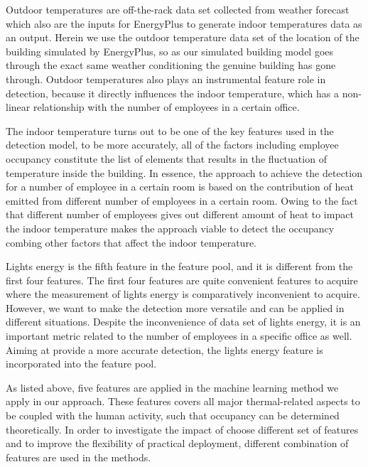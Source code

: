 Outdoor temperatures are off-the-rack data set collected from weather
forecast which also are the inputs for EnergyPlus to generate indoor
temperatures data as an output. Herein we use the outdoor
temperature data set of the location of the building simulated by EnergyPlus, so as
our simulated building model goes through the exact same weather
conditioning the genuine building has gone through. Outdoor
temperatures also plays an instrumental feature role in detection,
because it directly influences the indoor temperature, which has a
non-linear relationship with the number of employees in a certain
office.

The indoor temperature turns out to be one of the key features used in
the detection model, to be more accurately, all of the factors
including employee occupancy constitute the list of elements that
results in the fluctuation of temperature inside the building. In
essence, the approach to achieve the detection for a number of
employee in a certain room is based on the contribution of heat
emitted from different number of employees in a certain room. Owing to
the fact that different number of employees gives out different amount
of heat to impact the indoor temperature makes the approach viable to
detect the occupancy combing other factors that affect the indoor
temperature.

Lights energy is the fifth feature in the feature pool, and it is
different from the first four features. The first four features are quite
convenient features to acquire where the measurement of lights energy
is comparatively inconvenient to acquire. However, we want to make the
detection more versatile and can be applied in different situations.
Despite the inconvenience of data set of lights energy, it is an
important metric related to the number of employees in a specific office
as well. Aiming at provide a more accurate detection, the lights
energy feature is incorporated into the feature pool.

As listed above, five features are applied in the machine learning method we
apply in our approach. \textcolor{feb18rev}{These features covers all major
thermal-related aspects to be coupled with the human activity, such that
occupancy can be determined theoretically.  In order to investigate the impact
of choose different set of features and to improve the flexibility of practical
deployment, different combination of features are used in the methods.}

